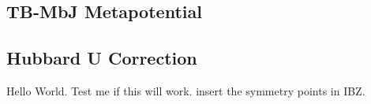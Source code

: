     \subsection{TB-MbJ Metapotential}
    \subsection{Hubbard U Correction}
 Hello World. Test me if this will work.
    {\color{red} insert the symmetry points in IBZ.}


